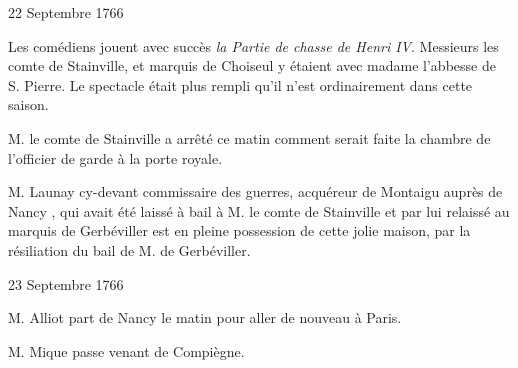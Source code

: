                      \begin{diary}{22 Septembre 1766}{}
                        
                         Les comédiens jouent avec succès
                              \emph{la Partie
                              de chasse de Henri IV}. Messieurs les comte de Stainville,
                           et marquis de Choiseul y
                           étaient avec madame
                              l’abbesse de S. Pierre. Le spectacle était plus
                           rempli qu’il n’est ordinairement dans cette saison. \bigskip
        
        
                        
                           M. le comte de Stainville a
                           arrêté ce matin
                           comment serait faite la chambre de l’officier
                           de garde à la porte royale. \bigskip
        
        
                        
                           M. Launay
                           cy-devant
                           commissaire des guerres, acquéreur
                           de Montaigu auprès de
                              Nancy , qui avait
                           été laissé à bail à M. le comte de
                              Stainville
                           et par lui relaissé au marquis de
                              Gerbéviller
                           est en pleine possession de cette jolie maison,
                           par la résiliation du bail de M. de
                              Gerbéviller. \bigskip
        
        
                     \end{diary}

                     \begin{diary}{23 Septembre 1766}{}
                        
                        
                           M. Alliot part de Nancy le matin pour aller
                           de nouveau à Paris. \bigskip
        
        
                        
                           M. Mique passe venant de
                              Compiègne. \bigskip
        
        
                     \end{diary}
                     

